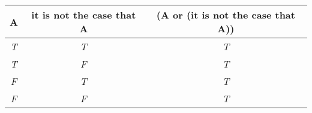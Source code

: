 


\begin{center}
\begin{tabular}{c c||c}
 A  & it is not the case that A & (A or  (it is not the case that A))\\
\hline
\emph{T} & \emph{T} & \emph{T} \\
\emph{T} & \emph{F} & \emph{T}  \\
\emph{F} & \emph{T} & \emph{T} \\
\emph{F} & \emph{F} & \emph{T} \\
\end{tabular}
\end{center}


